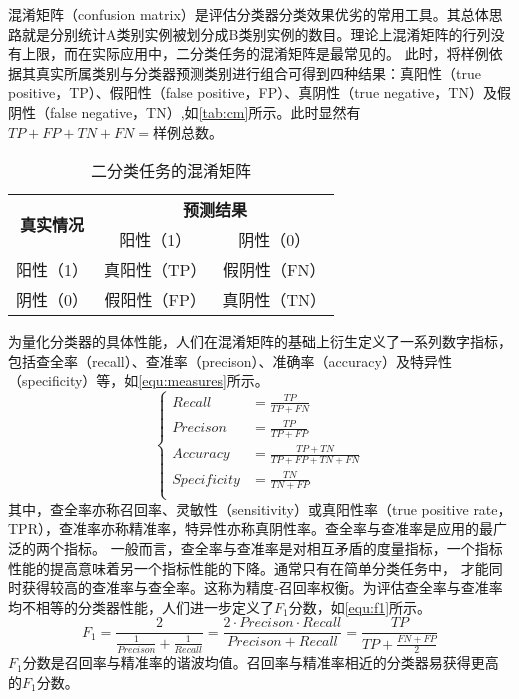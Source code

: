 混淆矩阵（confusion matrix）是评估分类器分类效果优劣的常用工具\cite{Zhou2016,Aurélien2018}。其总体思路就是分别统计A类别实例被划分成B类别实例的数目。理论上混淆矩阵的行列没有上限，而在实际应用中，二分类任务的混淆矩阵是最常见的。
此时，将样例依据其真实所属类别与分类器预测类别进行组合可得到四种结果：真阳性（true positive，TP）、假阳性（false positive，FP）、真阴性（true negative，TN）及假阴性（false negative，TN）,如\autoref{tab:cm}所示。此时显然有
$TP+FP+TN+FN=\text{样例总数}$。
\begin{table}[htbp]
      \centering
      \caption{\label{tab:cm}二分类任务的混淆矩阵}
      \begin{tabular}{ccc}
      \toprule
      \multicolumn{1}{c}{\multirow{2}[4]{*}{\textbf{真实情况}}} & \multicolumn{2}{c}{\textbf{预测结果}} \\
            \cmidrule{2-3}          & 阳性（1） & 阴性（0） \\
      \midrule
      阳性（1） & 真阳性（TP） & 假阴性（FN） \\
      阴性（0） & 假阳性（FP） & 真阴性（TN） \\
      \bottomrule
      \end{tabular}%
\end{table}%

为量化分类器的具体性能，人们在混淆矩阵的基础上衍生定义了一系列数字指标，包括查全率（recall）、查准率（precison）、准确率（accuracy）及特异性（specificity）等，如\autoref{equ:measures}所示。
\begin{equation}
      \label{equ:measures}
      \left \{
      \begin{aligned}
            Recall      &=\frac{TP}{TP+FN}         \\
            Precison    &=\frac{TP}{TP+FP}          \\
            Accuracy    &=\frac{TP+TN}{TP+FP+TN+FN} \\
            Specificity &=\frac{TN}{TN+FP}       \\
      \end{aligned}
      \right.
\end{equation}
其中，查全率亦称召回率、灵敏性（sensitivity）或真阳性率（true positive rate，TPR），查准率亦称精准率，特异性亦称真阴性率。查全率与查准率是应用的最广泛的两个指标\cite{Zhou2016,Aurélien2018}。
一般而言，查全率与查准率是对相互矛盾的度量指标，一个指标性能的提高意味着另一个指标性能的下降。通常只有在简单分类任务中，
才能同时获得较高的查准率与查全率。这称为精度-召回率权衡。为评估查全率与查准率均不相等的分类器性能，人们进一步定义了$F_1\text{分数}$，如\autoref{equ:f1}所示。
\begin{equation}
      \label{equ:f1}
      F_1=\frac{2}{\frac{1}{Precison}+\frac{1}{Recall}}=\frac{2\cdot Precison\cdot Recall}{Precison+Recall}=\frac{TP}{TP+\frac{FN+FP}{2}}
\end{equation}
$F_1\text{分数}$是召回率与精准率的谐波均值。召回率与精准率相近的分类器易获得更高的$F_1\text{分数}$。

